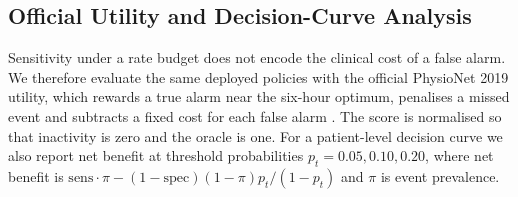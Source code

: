 \subsection{Official Utility and Decision-Curve Analysis}
\label{sec:utility}

Sensitivity under a rate budget does not encode the clinical cost of a false alarm. We therefore evaluate the same deployed policies with the official PhysioNet 2019 utility, which rewards a true alarm near the six-hour optimum, penalises a missed event and subtracts a fixed cost for each false alarm \citep{reyna2019early}. The score is normalised so that inactivity is zero and the oracle is one. For a patient-level decision curve \citep{vickers2006decision} we also report net benefit at threshold probabilities $p_t=0.05,0.10,0.20$, where net benefit is $\mathrm{sens}\cdot\pi-(1-\mathrm{spec})(1-\pi)p_t/(1-p_t)$ and $\pi$ is event prevalence.

\begin{table}[tb]
\centering
\caption{Official 2019 utility and decision-curve net benefit on the A calibration split and the transported B evaluation. ``Utility'' is challenge-normalised (inactive $=0$, oracle $=1$); NB$_{0.10}$ is patient-level net benefit at $p_t=0.10$. At 0.25 per day CRC improves utility over the blocked certificate; at 1 per day the blocked selector is better because CRC buys sensitivity with false alarms.}
\label{tab:utility}
\small
{}
\end{table}

